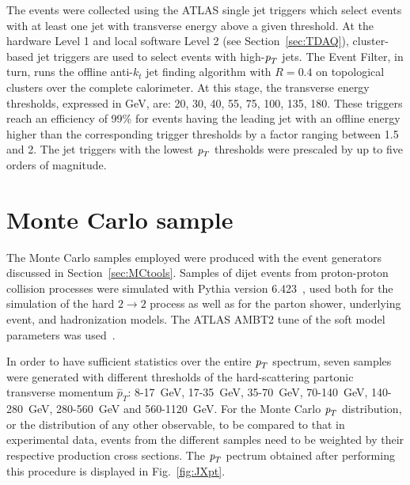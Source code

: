 The events were collected  using the ATLAS single jet triggers which select events with at least one jet with transverse energy above a given threshold.  At the hardware Level 1 and local software Level 2 (see Section~\ref{sec:TDAQ}), cluster-based jet triggers are used to select events with high-${\emph{p}_{T}}$ jets. The Event Filter, in turn, runs  the offline anti-$k_t$ jet finding algorithm with $R = 0.4$ on topological clusters over the complete calorimeter.  At this stage, the transverse energy thresholds, expressed in GeV, are: 20, 30, 40, 55, 75, 100, 135, 180. These triggers reach an efficiency of 99\% for events having the leading jet with an offline energy higher than the corresponding trigger thresholds by a factor ranging between 1.5 and 2. %
 The jet triggers with the lowest ${\emph{p}_{T}}$ thresholds were prescaled by up to five orders of magnitude. %




\section{Monte Carlo sample}\label{sec:analysis}

The Monte Carlo samples employed were produced with the event generators discussed in Section~\ref{sec:MCtools}. Samples of dijet events from proton-proton collision processes were simulated with {\sc Pythia} version 6.423~\cite{PYTHIA6}, used both for the simulation of the hard $2\rightarrow 2$ process as well as for the parton shower, underlying event, and hadronization models. The ATLAS AMBT2 tune of the soft model parameters was used~\cite{Pythia_MC11tune}.

In order to have sufficient statistics over the entire ${\emph{p}_{T}}$ spectrum, seven samples were generated with different thresholds of the hard-scattering partonic transverse momentum $\hat{p}_T$: 8-17~GeV, 17-35~GeV, 35-70~GeV, 70-140~GeV, 140-280~GeV, 280-560~GeV and 560-1120~GeV.
 For the Monte Carlo ${\emph{p}_{T}}$ distribution, or the distribution of any other observable,  to be compared to that in experimental data, events from the different samples need to be weighted by their respective production cross sections. The ${\emph{p}_{T}}$ pectrum obtained after performing this procedure is displayed in Fig.~\ref{fig:JXpt}.

